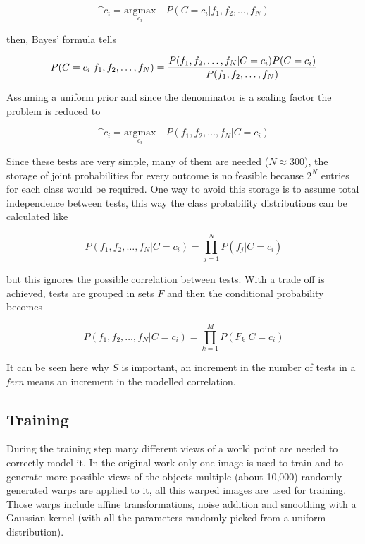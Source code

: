 \begin{equation}
  \^c_i = \underset{c_i}{\text{argmax}} \quad P(C = c_i | f_1, f_2, \ldots, f_N)
\end{equation}

then, Bayes' formula tells

\begin{equation}
  P(C = c_i | f_1, f_2, \ldots, f_N) = \frac{P(f_1,f_2,\ldots,f_N \arrowvert C=c_i) P(C=c_i)}{P(f_1,f_2,\ldots,f_N)}
\end{equation}

Assuming a uniform prior and since the denominator is a scaling factor the problem is reduced to

\begin{equation}
  \^c_i = \underset{c_i}{\text{argmax}} \quad P(f_1, f_2, \ldots, f_N | C = c_i)
\end{equation}

Since these tests are very simple, many of them are needed ($N \approx 300$), the storage of joint probabilities for every outcome is no feasible because $2^N$ entries for each class would be required. One way to avoid this storage is to assume total independence between tests, this way the class probability distributions can be calculated like

\begin{equation}
  P(f_1, f_2, \ldots, f_N | C = c_i) = \prod^{N}_{j=1}P(f_j | C = c_i)
\end{equation}

but this ignores the possible correlation between tests. With  a trade off is achieved, tests are grouped in sets $F$ and then the conditional probability becomes

\begin{equation}
  P(f_1, f_2, \ldots, f_N | C = c_i) = \prod^{M}_{k=1} P(F_k | C = c_i)
\end{equation}

It can be seen here why $S$ is important, an increment in the number of tests in a \textit{fern} means an increment in the modelled correlation.\\

\subsection{Training}
\label{sub:training}

During the training step many different views of a world point are needed to correctly model it. In the original work \cite{Ozuysal2010} only one image is used to train and to generate more possible views of the objects multiple (about 10,000) randomly generated warps are applied to it, all this warped images are used for training. Those warps include affine transformations, noise addition and smoothing with a Gaussian kernel (with all the parameters randomly picked from a uniform distribution).\\

